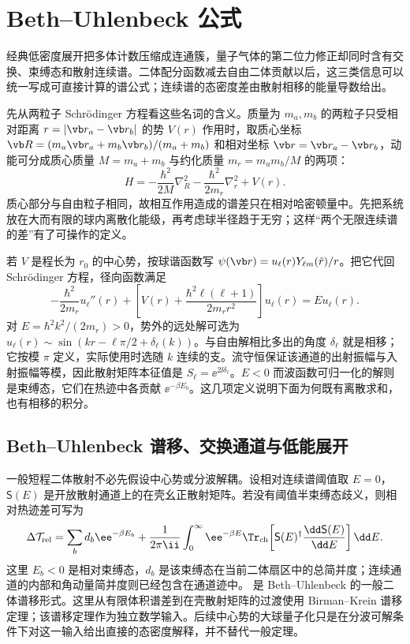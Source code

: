 \section{Beth--Uhlenbeck 公式}
\label{chap:phys-sm-interacting-quantum-gases}

经典低密度展开把多体计数压缩成连通簇，量子气体的第二位力修正却同时含有交换、束缚态和散射连续谱。二体配分函数减去自由二体贡献以后，这三类信息可以统一写成可直接计算的谱公式；连续谱的态密度差由散射相移的能量导数给出。

先从两粒子 Schrödinger 方程看这些名词的含义。质量为 $m_a,m_b$ 的两粒子只受相对距离 $r=|\vb r_a-\vb r_b|$ 的势 $V(r)$ 作用时，取质心坐标 $\vb R=(m_a\vb r_a+m_b\vb r_b)/(m_a+m_b)$ 和相对坐标 $\vb r=\vb r_a-\vb r_b$，动能可分成质心质量 $M=m_a+m_b$ 与约化质量 $m_r=m_am_b/M$ 的两项：
\[
H=-\frac{\hbar^2}{2M}\nabla_R^2
  -\frac{\hbar^2}{2m_r}\nabla_r^2+V(r).
\]
质心部分与自由粒子相同，故相互作用造成的谱差只在相对哈密顿量中。先把系统放在大而有限的球内离散化能级，再考虑球半径趋于无穷；这样“两个无限连续谱的差”有了可操作的定义。

若 $V$ 是程长为 $r_0$ 的中心势，按球谐函数写 $\psi(\vb r)=u_\ell(r)Y_{\ell m}(\hat r)/r$。把它代回 Schrödinger 方程，径向函数满足
\[
-\frac{\hbar^2}{2m_r}u_\ell''(r)
+\left[V(r)+\frac{\hbar^2\ell(\ell+1)}{2m_rr^2}\right]u_\ell(r)
=E u_\ell(r).
\]
对 $E=\hbar^2k^2/(2m_r)>0$，势外的远处解可选为 $u_\ell(r)\sim\sin(kr-\ell\pi/2+\delta_\ell(k))$。与自由解相比多出的角度 $\delta_\ell$ 就是相移；它按模 $\pi$ 定义，实际使用时选随 $k$ 连续的支。流守恒保证该通道的出射振幅与入射振幅等模，因此散射矩阵本征值是 $S_\ell=\ee^{2\ii\delta_\ell}$。$E<0$ 而波函数可归一化的解则是束缚态，它们在热迹中各贡献 $\ee^{-\beta E_b}$。这几项定义说明下面为何既有离散求和，也有相移的积分。

\subsection{Beth--Uhlenbeck 谱移、交换通道与低能展开}

一般短程二体散射不必先假设中心势或分波解耦。设相对连续谱阈值取 \(E=0\)，\(\mathsf S(E)\) 是开放散射通道上的在壳幺正散射矩阵。若没有阈值半束缚态歧义，则相对热迹差可写为
\begin{equation}
 \Delta\mathcal T_{\rm rel}
 =\sum_b d_b\ee^{-\beta E_b}
 +\frac{1}{2\pi\ii}
 \int_0^\infty
 \ee^{-\beta E}
 \Tr_{\rm ch}\!\left[
 \mathsf S(E)^\dagger
 \frac{\dd\mathsf S(E)}{\dd E}
 \right]\dd E.
 \label{eq:phys-sm-bu-s-matrix}
\end{equation}
这里 \(E_b<0\) 是相对束缚态，\(d_b\) 是该束缚态在当前二体扇区中的总简并度；连续通道的内部和角动量简并度则已经包含在通道迹中。 是 Beth--Uhlenbeck 的一般二体谱移形式。这里从有限体积谱差到在壳散射矩阵的过渡使用 Birman--Krein 谱移定理；该谱移定理作为独立数学输入。后续中心势的大球量子化只是在分波可解条件下对这一输入给出直接的态密度解释，并不替代一般定理。

